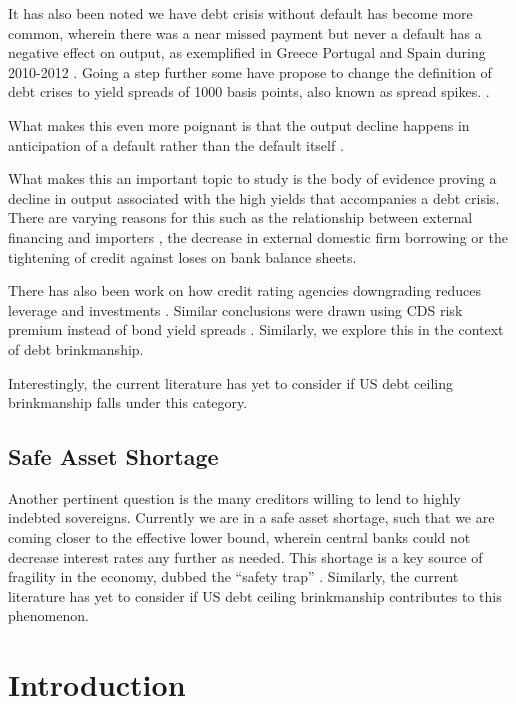 \documentclass[
  12pt]{article}
\begin{document}
It has also been noted we have debt crisis without default has become
more common, wherein there was a near missed payment but never a default
has a negative effect on output, as exemplified in Greece Portugal and
Spain during 2010-2012 \citet{mitchener2023} . Going a step further some
have propose to change the definition of debt crises to yield spreads of
1000 basis points, also known as spread spikes.
\citep{broner2013, aguiar, krishnamurthy}.

What makes this even more poignant is that the output decline happens in
anticipation of a default rather than the default itself
\citet{yeyati2011}.

What makes this an important topic to study is the body of evidence
proving a decline in output associated with the high yields that
accompanies a debt crisis. There are varying reasons for this such as
the relationship between external financing and importers
\citet{mendoza2012} , the decrease in external domestic firm
borrowing\citep{corsetti2012, das2010, gourinchas2016} or the tightening
of credit against loses on bank balance
sheets\citep{arellano, ferrando2017}.

There has also been work on how credit rating agencies downgrading
reduces leverage and investments \citet{almeida2017}. Similar
conclusions were drawn using CDS risk premium instead of bond yield
spreads \citep{brutti2015, bahaj2020}. Similarly, we explore this in the
context of debt brinkmanship.

Interestingly, the current literature has yet to consider if US debt
ceiling brinkmanship falls under this category.

\hypertarget{safe-asset-shortage}{%
\subsection{Safe Asset Shortage}\label{safe-asset-shortage}}

Another pertinent question is the many creditors willing to lend to
highly indebted sovereigns. Currently we are in a safe asset shortage,
such that we are coming closer to the effective lower bound, wherein
central banks could not decrease interest rates any further as needed.
This shortage is a key source of fragility in the economy, dubbed the
``safety trap'' \citet{caballero2017} . Similarly, the current
literature has yet to consider if US debt ceiling brinkmanship
contributes to this phenomenon.

\hypertarget{introduction}{%
\section{Introduction}\label{introduction}}
\end{document}
